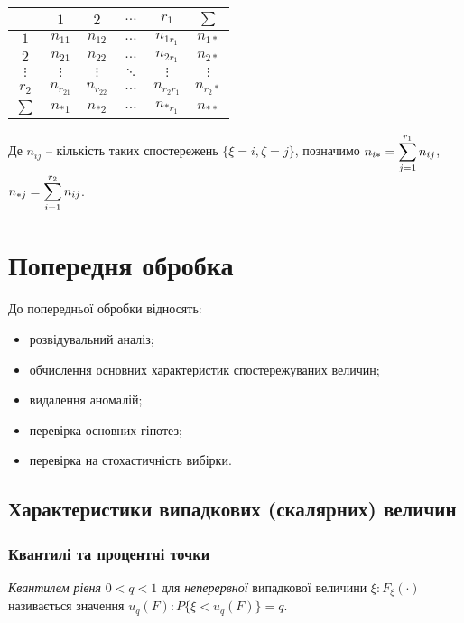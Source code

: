 \begin{table}[H]
	\centering
	\begin{tabular}{|c|c|c|c|c|c|}
	\hline
	& $1$ & $2$ & $\ldots$ & $r_1$ & $\sum$ \\ \hline
	$1$ & $n_{11}$ & $n_{12}$ & $\ldots$ & $n_{1r_1}$ & $n_{1*}$ \\ \hline
	$2$ & $n_{21}$ & $n_{22}$ & $\ldots$ & $n_{2r_1}$ & $n_{2*}$ \\ \hline
	$\vdots$ & $\vdots$ & $\vdots$ & $\ddots$ & $\vdots$ & $\vdots$ \\ \hline
	$r_2$ & $n_{r_21}$ & $n_{r_22}$ & $\ldots$ & $n_{r_2r_1}$ & $n_{r_2*}$ \\ \hline
	$\sum$ & $n_{*1}$ & $n_{*2}$ & $\ldots$ & $n_{*r_1}$ & $n_{**}$ \\ \hline
	\end{tabular}
\end{table}

Де $n_{ij}$ -- кількість таких спостережень $\{\xi=i,\zeta=j\}$, позначимо $n_{i*} = \displaystyle\sum\limits_{j=1}^{r_1} n_{ij}$, $n_{*j} = \displaystyle\sum\limits_{i=1}^{r_2} n_{ij}$. 

\section{Попередня обробка}
До попередньої обробки відносять:
\begin{itemize}
	\item розвідувальний аналіз;
	\item обчислення основних характеристик спостережуваних величин;
	\item видалення аномалій;
	\item перевірка основних гіпотез;
	\item перевірка на стохастичність вибірки.
\end{itemize}

\subsection{Характеристики випадкових (скалярних) величин}

\subsubsection{Квантилі та процентні точки}
 
\textit{Квантилем рівня} $0 < q < 1$ для \textit{неперервної} випадкової величини $\xi: F_\xi(\cdot)$ називається значення $u_q(F): P\{ \xi < u_q(F)\}=q$. \\

